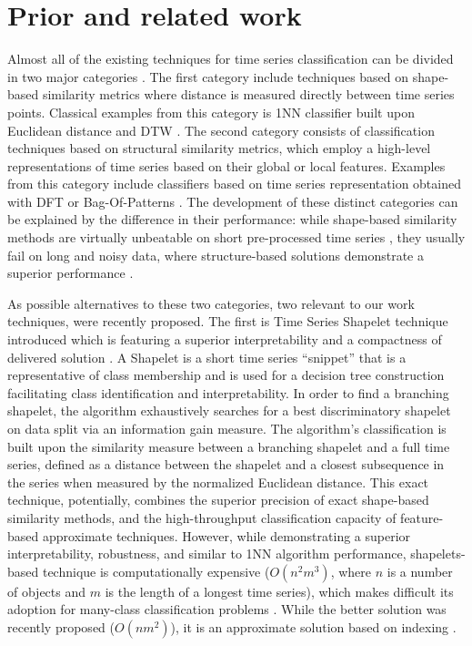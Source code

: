 \documentclass[conference]{IEEEtran}
\begin{document}
\vspace{-0.2cm}
\section{Prior and related work} \label{prior}
Almost all of the existing techniques for time series classification can be divided 
in two major categories \cite{comparison}. 
The first category include techniques based on shape-based similarity metrics 
where distance is measured directly between time series points. 
Classical examples from this category is 1NN classifier 
built upon Euclidean distance \cite{1NN} and DTW \cite{DTW}. 
The second category consists of classification techniques based on 
structural similarity metrics, which employ a high-level representations 
of time series based on their global or local features. 
Examples from this category include classifiers based on 
time series representation obtained with DFT \cite{DFT} or Bag-Of-Patterns \cite{bag_patterns}. 
The development of these distinct categories can be explained by 
the difference in their performance: 
while shape-based similarity methods are virtually unbeatable on short 
pre-processed time series \cite{benchmark}, 
they usually fail on long and noisy data, where structure-based solutions 
demonstrate a superior performance \cite{bag_patterns}. 

As possible alternatives to these two categories, 
two relevant to our work techniques, were recently proposed. 
The first is Time Series Shapelet technique introduced which is 
featuring a superior interpretability and a compactness of delivered solution \cite{shapelet}. 
A Shapelet is a short time series ``snippet'' that is a representative of class
membership and is used for a decision tree construction facilitating class 
identification and interpretability.
In order to find a branching shapelet, the algorithm exhaustively searches 
for a best discriminatory shapelet on data split via an information gain measure. 
The algorithm's classification is built upon the similarity measure between a branching 
shapelet and a full time series, defined as a distance between the shapelet and 
a closest subsequence in the series when measured by the normalized Euclidean distance. 
This exact technique, potentially, combines the superior precision of 
exact shape-based similarity methods, and the high-throughput 
classification capacity of feature-based approximate techniques. 
However, while demonstrating a superior interpretability, robustness, 
and similar to 1NN algorithm performance, shapelets-based technique is 
computationally expensive ($O(n^{2}m^{3})$, where $n$ is a number of 
objects and $m$ is the length of a longest time series),
which makes difficult its adoption for many-class classification problems \cite{bagnal}. 
While the better solution was recently proposed ($O(nm^{2})$), it is an 
approximate solution based on indexing \cite{fast-shapelets}.
\end{document}
